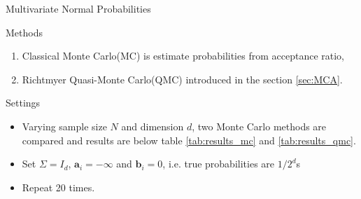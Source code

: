 \begin{frame}{Multivariate Normal Probabilities} 

	\begin{block}{Methods}
		\begin{enumerate}
			\item Classical Monte Carlo(MC) is estimate probabilities from acceptance ratio,
			\item Richtmyer Quasi-Monte Carlo(QMC) introduced in the section \ref{sec:MCA}.
		\end{enumerate}
	\end{block}

	\begin{block}{Settings}
		\begin{itemize}
			\item Varying sample size $N$ and dimension $d$, two Monte Carlo methods are compared and results are below table \ref{tab:results_mc} and \ref{tab:results_qmc}. 
			\item Set $\Sigma = I_d$, $\mathbf{a}_i = -\infty$ and $\mathbf{b}_i = 0$, i.e. true probabilities are $1/2^d$s
			\item Repeat 20 times.
		\end{itemize}
	\end{block}

\end{frame}
	
